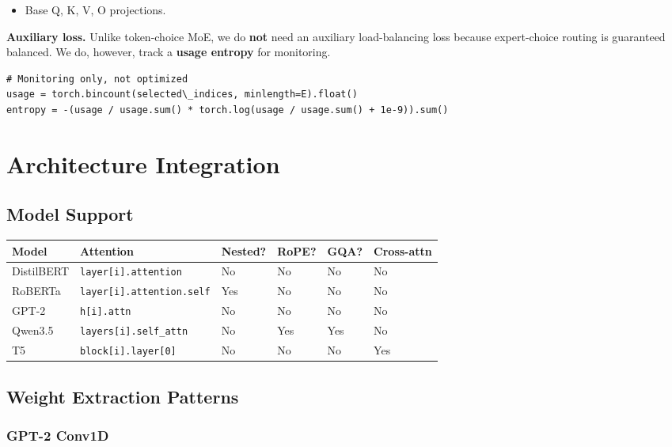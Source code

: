\begin{itemize}
\item Base Q, K, V, O projections.

\end{itemize}
\textbf{Auxiliary loss.} Unlike token-choice MoE, we do \textbf{not} need an 
auxiliary load-balancing loss because expert-choice routing is guaranteed 
balanced. We do, however, track a \textbf{usage entropy} for monitoring.

\begin{lstlisting}
# Monitoring only, not optimized
usage = torch.bincount(selected\_indices, minlength=E).float()
entropy = -(usage / usage.sum() * torch.log(usage / usage.sum() + 1e-9)).sum()
\end{lstlisting}



\section{Architecture Integration}

\subsection{Model Support}

\begin{table}[H]
\centering
\small
\begin{tabular}{llllll}
\toprule
\textbf{Model} & \textbf{Attention} & \textbf{Nested?} & \textbf{RoPE?} & \textbf{GQA?} & \textbf{Cross-attn} \\
\midrule
DistilBERT & \texttt{layer[i].attention} & No & No & No & No \\
RoBERTa & \texttt{layer[i].attention.self} & Yes & No & No & No \\
GPT-2 & \texttt{h[i].attn} & No & No & No & No \\
Qwen3.5 & \texttt{layers[i].self\_attn} & No & Yes & Yes & No \\
T5 & \texttt{block[i].layer[0]} & No & No & No & Yes \\
\bottomrule
\end{tabular}
\end{table}

\subsection{Weight Extraction Patterns}

\subsubsection{GPT-2 Conv1D}


